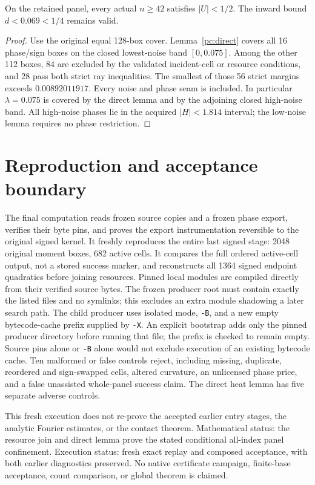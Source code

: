 \documentclass[11pt]{article}
\begin{document}
\begin{proposition}
On the retained panel, every actual $n\ge42$ satisfies $|U|<1/2$.
The inward bound $d<0.069<1/4$ remains valid.
\end{proposition}
\begin{proof}
Use the original equal 128-box cover. Lemma~\ref{pc:direct} covers all
16 phase/sign boxes on the closed lowest-noise band $[0,0.075]$.
Among the other 112 boxes, 84 are excluded by the validated incident-cell
or resource conditions, and 28 pass both strict ray inequalities.
The smallest of those 56 strict margins exceeds $0.00892011917$.
Every noise and phase seam is included. In particular $\lambda=0.075$
is covered by the direct lemma and by the adjoining closed high-noise
band. All high-noise phases lie in the acquired $|H|<1.814$ interval;
the low-noise lemma requires no phase restriction.
\end{proof}

\section{Reproduction and acceptance boundary}
The final computation reads frozen source copies and a frozen phase export,
verifies their byte pins, and proves the export instrumentation reversible
to the original signed kernel. It freshly reproduces the entire last
signed stage: 2048 original moment boxes, 682 active cells. It compares
the full ordered active-cell output, not a stored success marker, and
reconstructs all 1364 signed endpoint quadratics before joining resources.
Pinned local modules are compiled directly from their verified source bytes.
The frozen producer root must contain exactly the listed files and no
symlinks; this excludes an extra module shadowing a later search path.
The child producer uses isolated mode, \texttt{-B}, and a new empty
bytecode-cache prefix supplied by \texttt{-X}. An explicit bootstrap adds
only the pinned producer directory before running that file; the prefix
is checked to remain empty. Source pins alone or
\texttt{-B} alone would not exclude execution of an existing bytecode cache.
Ten malformed or false controls reject, including missing, duplicate,
reordered and sign-swapped cells, altered curvature, an unlicensed phase
price, and a false unassisted whole-panel success claim. The direct heat
lemma has five separate adverse controls.

This fresh execution does not re-prove the accepted earlier entry stages,
the analytic Fourier estimates, or the contact theorem. Mathematical
status: the resource join and direct lemma prove the stated conditional
all-index panel confinement. Execution status: fresh exact replay and
composed acceptance, with both earlier diagnostics preserved. No native
certificate campaign, finite-base acceptance, count comparison, or global
theorem is claimed.
\end{document}

